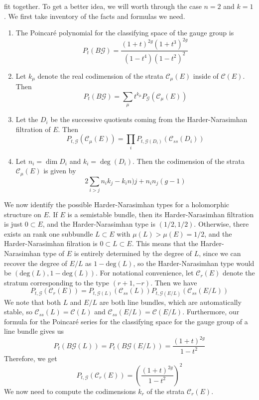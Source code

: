 fit together. To get a better idea, we will worth through the case
$n = 2$ and $k = 1$. We first take inventory of the facts and formulas we need.
\begin{enumerate}
  \item The Poincar\'e polynomial for the classifying space of the gauge group is
  \[
  P_t(B\mathscr{G}) = \frac{(1+t)^{2g}(1+t^3)^{2g}}{(1-t^4)(1-t^2)^2}
  \]
  \item  Let $k_\mu$ denote the real codimension of the strata $\mathscr{C}_\mu(E)$
  inside of $\mathscr{C}(E)$. Then
  \[
  P_t(B\mathscr{G}) = \sum_{\mu}t^{k_\mu}P_{\mathscr{G}}(\mathscr{C}_\mu(E))
  \]
  \item Let the $D_i$ be the successive quotients coming from the Harder-Narasimhan
  filtration of $E$. Then
  \[
  P_{t,\mathscr{G}}(\mathscr{C}_\mu(E))
  = \prod_iP_{t,\mathscr{G}(D_i)}(\mathscr{C}_{ss}(D_i))
  \]
  \item Let $n_i = \dim D_i$ and $k_i = \deg(D_i)$. Then the codimension
  of the strata $\mathscr{C}_\mu(E)$ is given by
  \[
  2\sum_{i > j}n_ik_j-k_in)j + n_in_j(g-1)
  \]
\end{enumerate}
%
We now identify the possible Harder-Narasimhan types for a holomorphic structure
on $E$. If $E$ is a semistable bundle, then its Harder-Narasimhan filtration
is just $0 \subset E$, and the Harder-Narasimhan type is $(1/2,1/2)$. Otherwise,
there exists an rank one subbundle $L \subset E$ with $\mu(L) > \mu(E) = 1/2$, and
the Harder-Narasimhan filration is $0 \subset L \subset E$. This means that the
Harder-Narasimhan type of $E$ is entirely determined by the degree of $L$, since
we can recover the degree of $E/L$ as $1 - \mathrm{deg}(L)$, so the
Harder-Narasimhan type would be $(\mathrm{deg}(L), 1- \mathrm{deg}(L))$. For
notational convenience, let $\mathscr{C}_r(E)$ denote the stratum corresponding
to the type $(r+1,-r)$. Then we have
\[
P_{t,\mathscr{G}}(\mathscr{C}_r(E))
= P_{t,\mathscr{G}(L)}(\mathscr{C}_{ss}(L)) P_{t,\mathscr{G}(E/L)}(\mathscr{C}_{ss}(E/L))
\]
We note that both $L$ and $E/L$ are both line bundles, which are automatically stable,
so $\mathscr{C}_{ss}(L) = \mathscr{C}(L)$ and $\mathscr{C}_{ss}(E/L) = \mathscr{C}(E/L)$.
Furthermore, our formula for the Poincar\'e series for the classifying space
for the gauge group of a line bundle gives us
\[
P_t(B\mathscr{G}(L)) = P_t(B\mathscr{G}(E/L)) = \frac{(1+t)^{2g}}{1-t^2}
\]
Therefore, we get
\[
P_{t, \mathscr{G}}(\mathscr{C}_r(E)) = \left(\frac{(1+t)^{2g}}{1-t^2}\right)^2
\]
We now need to compute the codimensions $k_r$ of the strata $\mathscr{C}_r(E)$.
